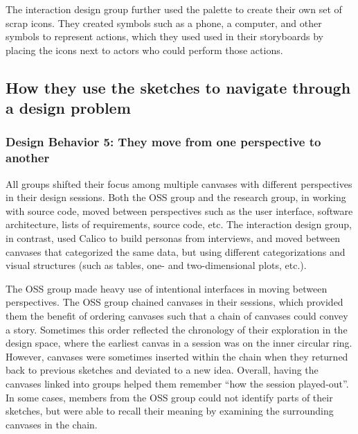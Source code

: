 \documentclass[12pt,fleqn]{ucithesis}
\begin{document}
The interaction design group further used the palette to create their own set of scrap icons. They created symbols such as a phone, a computer, and other symbols to represent actions, which they used used in their storyboards by placing the icons next to actors who could perform those actions.


%

\subsection{How they use the sketches to navigate through a design problem}

\subsubsection{Design Behavior 5: They move from one perspective to another}

All groups shifted their focus among multiple canvases with different perspectives in their design sessions. Both the OSS group and the research group, in working with source code, moved between perspectives such as the user interface, software architecture, lists of requirements, source code, etc. The interaction design group, in contrast, used Calico to build personas from interviews, and moved between canvases that categorized the same data, but using different categorizations and visual structures (such as tables, one- and two-dimensional plots, etc.). 

The OSS group made heavy use of intentional interfaces in moving between perspectives. The OSS group chained canvases in their sessions, which provided them the benefit of ordering canvases such that a chain of canvases could convey a story. Sometimes this order reflected the chronology of their exploration in the design space, where the earliest canvas in a session was on the inner circular ring. However, canvases were sometimes inserted within the chain when they returned back to previous sketches and deviated to a new idea. Overall, having the canvases linked into groups helped them remember ``how the session played-out''. In some cases, members from the OSS group could not identify parts of their sketches, but were able to recall their meaning by examining the surrounding canvases in the chain.
\end{document}

